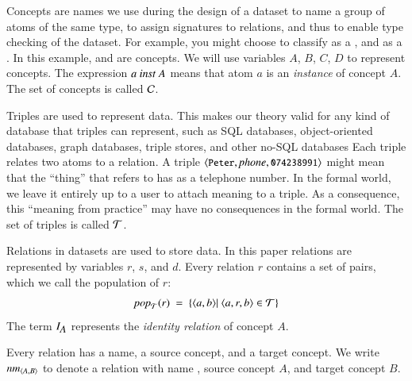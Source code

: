 \documentclass{elsarticle}
\begin{document}
   Concepts are names we use during the design of a dataset
   to name a group of atoms of the same type,
   to assign signatures to relations, and thus
   to enable type checking of the dataset.
   For example, you might choose to classify  as a , and  as a .
   In this example,  and  are concepts.
    We will use variables $A$, $B$, $C$, $D$ to represent concepts.
   The expression $a\ \inst\ A$ means that atom $a$ is an \emph{instance} of concept $A$.
   The set of concepts is called $\mathcal{C}$.
   
   Triples are used to represent data.
   This makes our theory valid for any kind of database that triples can represent,
   such as SQL databases, object-oriented databases, graph databases, triple stores, and other no-SQL databases
   Each triple relates two atoms to a relation.
   A triple $\langle{\text{{\tt\small Peter}}},{\text{\it phone\/}},{\text{{\tt\small 074238991}}}\rangle$ might mean that the ``thing'' that  refers to
   has  as a telephone number.
   In the formal world, we leave it entirely up to a user to attach meaning to a triple.
   As a consequence, this ``meaning from practice'' may have no consequences in the formal world.
   The set of triples is called $\mathcal{T}$.

   Relations in datasets are used to store data.
   In this paper relations are represented by variables $r$, $s$, and $d$.
   Every relation $r$ contains a set of pairs, which we call the population of $r$:
\begin{equation}
   \pop{\triples}{r}\ =\ \{ \pair{a}{b}|\ \triple{a}{r}{b}\in\triples\}
\end{equation}
   The term $I_{\text{\it \small A\/}}$ represents the \emph{identity relation} of concept $A$.

   Every relation has a name, a source concept, and a target concept.
   We write $\text{\it nm\/}_{\langle{A},{B}\rangle}$ to denote a relation with name , source concept $A$, and target concept $B$.
\end{document}
